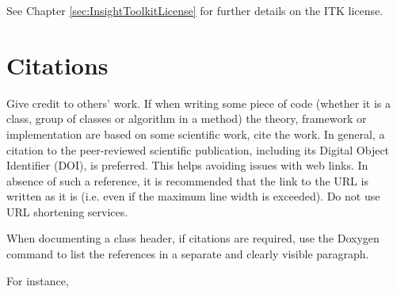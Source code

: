See Chapter \ref{sec:InsightToolkitLicense} for further details on the ITK
license.


\section{Citations}
\label{sec:Citations}

Give credit to others' work. If when writing some piece of code (whether it is a
class, group of classes or algorithm in a method) the theory, framework or
implementation are based on some scientific work, cite the work. In general, a
citation to the peer-reviewed scientific publication, including its Digital
Object Identifier (DOI), is preferred. This helps avoiding issues with web
links. In absence of such a reference, it is recommended that the link to the
URL is written as it is (i.e. even if the maximum line width is exceeded). Do
not use URL shortening services.

When documenting a class header, if citations are required, use the Doxygen
 command to list the references in a separate and clearly
visible paragraph.

For instance,


